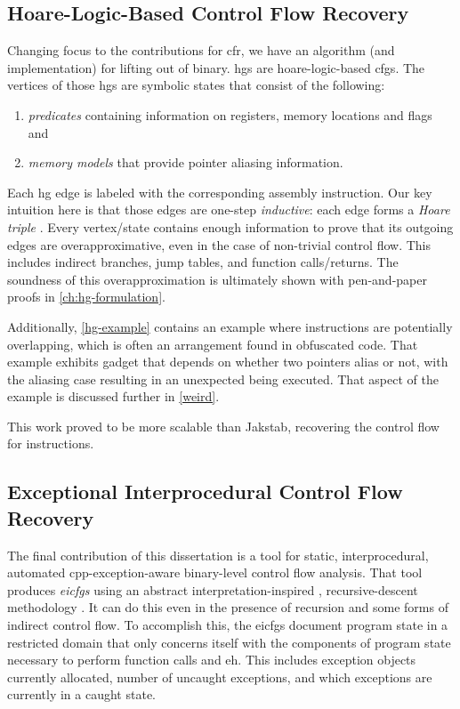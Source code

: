 \subsection{Hoare-Logic-Based Control Flow Recovery}
Changing focus to the contributions for \gls{cfr}, we have an algorithm (and implementation) for lifting  out of  binary.
\Glspl{hg} are \gls{hoare-logic}-based \glspl{cfg}.
The vertices of those \glspl{hg} are symbolic states that consist of the following:
\begin{enumerate}
  \item \emph{predicates} containing information on registers, memory locations and flags and
  \item \emph{memory models} that provide pointer aliasing information.
\end{enumerate}
Each \gls{hg} edge is labeled with the corresponding assembly instruction.
Our key intuition here is that those edges are one-step \emph{inductive}:
each edge forms a \emph{Hoare triple}
\autocite{hoare1969axiomatic}.
Every vertex/state contains enough information to prove that its outgoing edges are overapproximative,
even in the case of non-trivial control flow.
This includes indirect branches, jump tables, and function calls/returns.
The soundness of this overapproximation is ultimately shown with pen-and-paper proofs in \cref{ch:hg-formulation}.

Additionally, \cref{hg-example} contains an example where instructions are potentially overlapping, which is often an arrangement found in obfuscated code.
That example exhibits  gadget that depends on whether two pointers alias or not, with the aliasing case resulting in an unexpected  being executed. That aspect of the example is discussed further in \cref{weird}.

This work proved to be more scalable than Jakstab, recovering the control flow for  instructions.

\subsection{Exceptional Interprocedural Control Flow Recovery}
The final contribution of this dissertation is a tool for static, interprocedural, automated \gls{cpp}-exception-aware \autocite{cxxEhAbi} binary-level control flow analysis.
That tool produces \emph{\glspl{eicfg}} using an abstract interpretation-inspired \autocite{cousot1976static,cousot1977abstract}, recursive-descent methodology \autocite{nagy2022bobw}.
It can do this even in the presence of recursion and some forms of indirect control flow.
To accomplish this, the \glspl{eicfg} document program state in a restricted domain that only concerns itself with the components of program state necessary to perform function calls and \gls{eh}.
This includes exception objects currently allocated, number of uncaught exceptions, and which exceptions are currently in a caught state.

